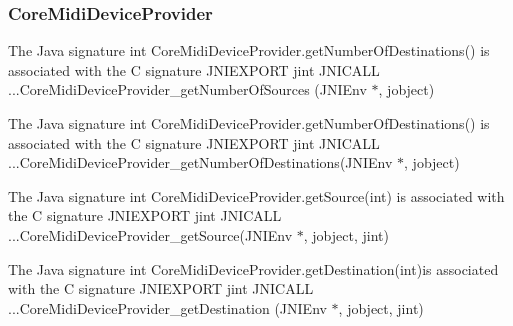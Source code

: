 {\ttfamily  \subsubsection*{CoreMidiDeviceProvider}}

{\ttfamily }

{\ttfamily 
\begin{DoxyItemize}
\item The Java signature {\ttfamily int CoreMidiDeviceProvider.getNumberOfDestinations()} is associated with the C signature {\ttfamily JNIEXPORT jint JNICALL ...CoreMidiDeviceProvider\_\-getNumberOfSources (JNIEnv $\ast$, jobject)}
\end{DoxyItemize}}

{\ttfamily 
\begin{DoxyItemize}
\item The Java signature {\ttfamily int CoreMidiDeviceProvider.getNumberOfDestinations()} is associated with the C signature {\ttfamily JNIEXPORT jint JNICALL ...CoreMidiDeviceProvider\_\-getNumberOfDestinations(JNIEnv $\ast$, jobject)}
\end{DoxyItemize}}

{\ttfamily 
\begin{DoxyItemize}
\item The Java signature {\ttfamily int CoreMidiDeviceProvider.getSource(int)} is associated with the C signature {\ttfamily JNIEXPORT jint JNICALL ...CoreMidiDeviceProvider\_\-getSource(JNIEnv $\ast$, jobject, jint)}
\item The Java signature {\ttfamily int CoreMidiDeviceProvider.getDestination(int){\ttfamily  is associated with the C signature {\ttfamily JNIEXPORT jint JNICALL ...CoreMidiDeviceProvider\_\-getDestination (JNIEnv $\ast$, jobject, jint)}}}
\item {}
\end{DoxyItemize}}

{}

{\ttfamily {\ttfamily {\ttfamily }}}

{}

